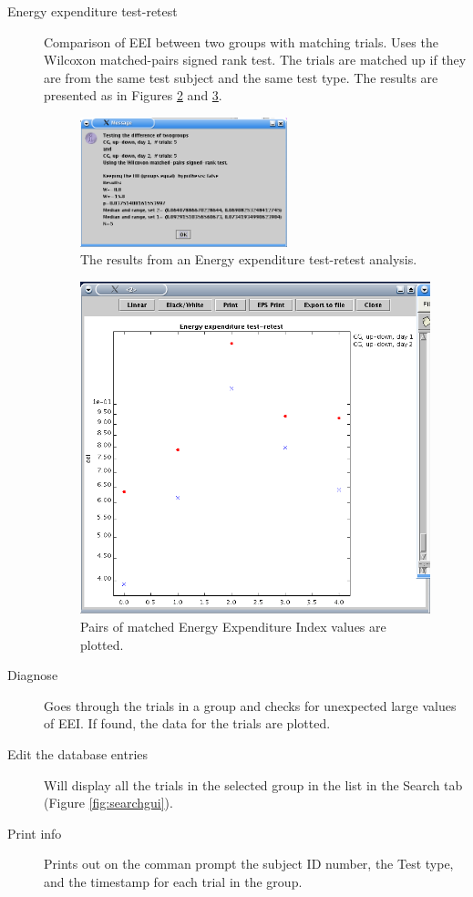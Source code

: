 \documentclass[a4paper,11pt]{article}
\begin{document}
\begin{description}
\begin{figure}[htbp]
    \label{fig:eeplot}
  \end{figure}
\item[Energy expenditure test-retest] Comparison of EEI between two
  groups with matching trials. Uses the Wilcoxon matched-pairs signed
  rank test. The trials are matched up if they are from the same test
  subject and the same test type. The results are presented as in
  Figures \ref{fig:eetestretest} and \ref{fig:eetestretestplot}.
  \begin{figure}[htbp]
    \centering
    \includegraphics[width=60mm]{figures/eetestretestresult.png}
    \caption{The results from an Energy expenditure test-retest analysis.}
    \label{fig:eetestretest}
  \end{figure}
  \begin{figure}[htbp]
    \centering
    \includegraphics[width=120mm]{figures/eetestretestplot.png}
    \caption{Pairs of matched Energy Expenditure Index values are plotted.}
    \label{fig:eetestretestplot}
  \end{figure}

\item[Diagnose] Goes through the trials in a group and checks for
  unexpected large values of EEI. If found, the data for the trials
  are plotted. 

\item[Edit the database entries] Will display all the trials in the
  selected group in the list in the Search tab (Figure
  \ref{fig:searchgui}). 

\item[Print info] Prints out on the comman prompt the subject ID
  number, the Test type, and the   timestamp for each trial in the group. 
\end{description}
\end{document}
